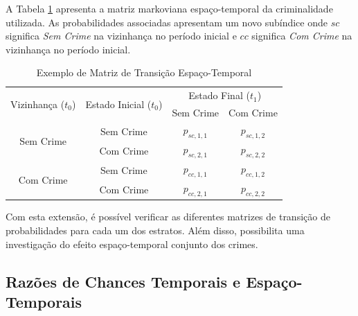 \documentclass[12pt,openright,oneside,a4paper,english,french,spanish]{abntex2}
\numberwithin{table}{section} %
\numberwithin{figure}{section} %
\begin{document}
A Tabela \ref{tab:matriz_transicao_espaco_temporal_generica} apresenta a matriz markoviana espaço-temporal da criminalidade utilizada. As probabilidades associadas apresentam um novo subíndice onde $sc$ significa \textit{Sem Crime} na vizinhança no período inicial e $cc$ significa \textit{Com Crime} na vizinhança no período inicial.




\begin{table}[H]
\centering
        \begin{tabular}{cccc}
            \hline
            \multirow{2}{*}{Vizinhança ($t_0$)} & \multirow{2}{*}{Estado Inicial ($t_0$)} & \multicolumn{2}{c}{Estado Final ($t_1$)}  \\\cline{3-4} %
                                        & & \multicolumn{1}{l}{Sem Crime} & \multicolumn{1}{l}{Com Crime} \\\hline
            \multirow{2}{*}{Sem Crime} & {Sem Crime} & {$p_{sc,1,1}$} & {$p_{sc,1,2}$} \\
                                       & {Com Crime} & {$p_{sc,2,1}$} & {$p_{sc,2,2}$} \\\hline
            \multirow{2}{*}{Com Crime} & {Sem Crime} & {$p_{cc,1,1}$} & {$p_{cc,1,2}$} \\
                                       & {Com Crime} & {$p_{cc,2,1}$} & {$p_{cc,2,2}$} \\\hline
        \end{tabular}
    \caption{Exemplo de Matriz de Transição Espaço-Temporal}
    \label{tab:matriz_transicao_espaco_temporal_generica}
\end{table}

Com esta extensão, é possível verificar as diferentes matrizes de transição de probabilidades para cada um dos estratos. Além disso, possibilita uma investigação do efeito espaço-temporal conjunto dos crimes.


\subsection{Razões de Chances Temporais e Espaço-Temporais\label{sec:odds_acoplamento}}
\end{document}
